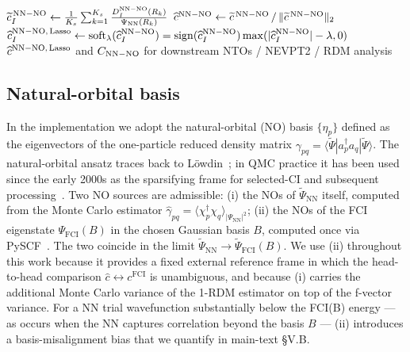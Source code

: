 \documentclass[journal=jctcce,manuscript=suppinfo,layout=traditional]{achemso}
\begin{document}
\begin{algorithm}[h]
\begin{algorithmic}[1]
  \State $\widetilde c_I^{\,\rm NN-NO} \gets
         \frac{1}{K_s}\sum_{k=1}^{K_s}
         \frac{D_I^{\rm NN-NO}(R_k)}{\Psi_{\rm NN}(R_k)}$
\EndFor
\State $\widehat c^{\rm NN-NO} \gets
       \widetilde c^{\,\rm NN-NO} \,/\,
       \|\widetilde c^{\,\rm NN-NO}\|_2$
\State $\widehat c^{\rm NN-NO,\,\rm Lasso}_I \gets
       \mathrm{soft}_\lambda(\widehat c^{\rm NN-NO}_I)
       = \mathrm{sign}(\widehat c^{\rm NN-NO}_I)
         \max(|\widehat c^{\rm NN-NO}_I| - \lambda, 0)$
\State \Return $\widehat c^{\rm NN-NO,\,\rm Lasso}$ and
       $C_{\rm NN-NO}$ for downstream NTOs / NEVPT2 / RDM analysis
\end{algorithmic}
\end{algorithm}

\subsection{Natural-orbital basis}
\label{sec:nn_no_source}

In the implementation we adopt the natural-orbital (NO) basis
$\{\eta_p\}$ defined as the eigenvectors of the one-particle reduced
density matrix
$\gamma_{pq} = \langle \widetilde{\Psi} | a_p^{\dagger} a_q
| \widetilde{\Psi} \rangle$. The natural-orbital ansatz traces back to
L\"owdin~\cite{Lowdin1955natural}; in QMC practice it has been used
since the early 2000s as the sparsifying frame for selected-CI and
subsequent
processing~\cite{Per2008NOVMC,Filippi2000NO,Bytautas2013NOs}. Two
NO sources are admissible:
(i) the NOs of $\widetilde{\Psi}_{\mathrm{NN}}$ itself, computed from
the Monte Carlo estimator
$\widehat{\gamma}_{pq} = \langle \chi_p^{\dagger} \chi_q
\rangle_{|\Psi_{\mathrm{NN}}|^2}$;
(ii) the NOs of the FCI eigenstate $\Psi_{\mathrm{FCI}}(B)$ in the
chosen Gaussian basis $B$, computed once via PySCF~\cite{PySCF2020}.
The two coincide in the limit
$\widetilde{\Psi}_{\mathrm{NN}} \to \widetilde{\Psi}_{\mathrm{FCI}}(B)$.
We use (ii) throughout this work because it provides a fixed external
reference frame in which the head-to-head comparison
$\widehat{c} \leftrightarrow c^{\mathrm{FCI}}$ is unambiguous, and
because (i) carries the additional Monte Carlo variance of the 1-RDM
estimator on top of the f-vector variance. For a NN trial wavefunction
substantially below the FCI(B) energy --- as occurs when the NN
captures correlation beyond the basis $B$ --- (ii) introduces a
basis-misalignment bias that we quantify in
main-text \S V.B.
\end{document}
